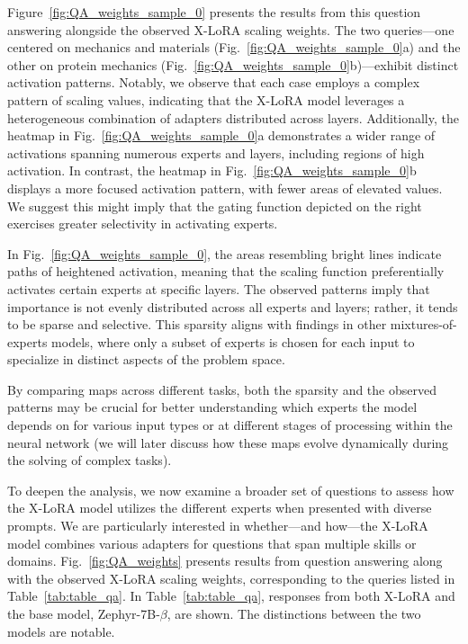 Figure~\ref{fig:QA_weights_sample_0} presents the results from this question answering alongside the observed X-LoRA scaling weights. The two queries—one centered on mechanics and materials (Fig.~\ref{fig:QA_weights_sample_0}a) and the other on protein mechanics (Fig.~\ref{fig:QA_weights_sample_0}b)—exhibit distinct activation patterns. Notably, we observe that each case employs a complex pattern of scaling values, indicating that the X-LoRA model leverages a heterogeneous combination of adapters distributed across layers. Additionally, the heatmap in Fig.~\ref{fig:QA_weights_sample_0}a demonstrates a wider range of activations spanning numerous experts and layers, including regions of high activation. In contrast, the heatmap in Fig.~\ref{fig:QA_weights_sample_0}b displays a more focused activation pattern, with fewer areas of elevated values. We suggest this might imply that the gating function depicted on the right exercises greater selectivity in activating experts.

In Fig.~\ref{fig:QA_weights_sample_0}, the areas resembling bright lines indicate paths of heightened activation, meaning that the scaling function preferentially activates certain experts at specific layers. The observed patterns imply that importance is not evenly distributed across all experts and layers; rather, it tends to be sparse and selective. This sparsity aligns with findings in other mixtures-of-experts models, where only a subset of experts is chosen for each input to specialize in distinct aspects of the problem space.

By comparing maps across different tasks, both the sparsity and the observed patterns may be crucial for better understanding which experts the model depends on for various input types or at different stages of processing within the neural network (we will later discuss how these maps evolve dynamically during the solving of complex tasks).

To deepen the analysis, we now examine a broader set of questions to assess how the X-LoRA model utilizes the different experts when presented with diverse prompts. We are particularly interested in whether—and how—the X-LoRA model combines various adapters for questions that span multiple skills or domains. Fig.~\ref{fig:QA_weights} presents results from question answering along with the observed X-LoRA scaling weights, corresponding to the queries listed in Table~\ref{tab:table_qa}. In Table~\ref{tab:table_qa}, responses from both X-LoRA and the base model, Zephyr-7B-$\beta$, are shown. The distinctions between the two models are notable.

